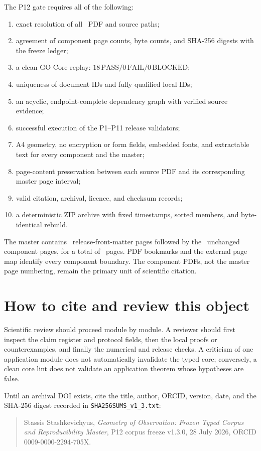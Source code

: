 \documentclass[11pt,a4paper]{article}
\theoremstyle{definition}
\theoremstyle{plain}
\theoremstyle{remark}
\begin{document}
The P12 gate requires all of the following:
\begin{enumerate}[leftmargin=*,itemsep=2pt]
  \item exact resolution of all \ModuleCount\ PDF and source paths;
  \item agreement of component page counts, byte counts, and SHA-256
    digests with the freeze ledger;
  \item a clean GO Core replay:
    \(18\,\mathrm{PASS}/0\,\mathrm{FAIL}/0\,\mathrm{BLOCKED}\);
  \item uniqueness of document IDs and fully qualified local IDs;
  \item an acyclic, endpoint-complete dependency graph with verified
    source evidence;
  \item successful execution of the P1--P11 release validators;
  \item A4 geometry, no encryption or form fields, embedded fonts, and
    extractable text for every component and the master;
  \item page-content preservation between each source PDF and its
    corresponding master page interval;
  \item valid citation, archival, licence, and checksum records;
  \item a deterministic ZIP archive with fixed timestamps, sorted
    members, and byte-identical rebuild.
\end{enumerate}

The master contains \FrontMatterPageCount\ release-front-matter pages
followed by the \ComponentPageCount\ unchanged component pages, for a
total of \MasterPageCount\ pages.  PDF bookmarks and the external page
map identify every component boundary.  The component PDFs, not the
master page numbering, remain the primary unit of scientific citation.

\section{How to cite and review this object}

Scientific review should proceed module by module.  A reviewer should
first inspect the claim register and protocol fields, then the local
proofs or counterexamples, and finally the numerical and release
checks.  A criticism of one application module does not automatically
invalidate the typed core; conversely, a clean core lint does not
validate an application theorem whose hypotheses are false.

Until an archival DOI exists, cite the title, author, ORCID, version,
date, and the SHA-256 digest recorded in
\texttt{SHA256SUMS\_v1\_3.txt}:
\begin{quote}\small
Stassis Stashkevichyus,
\emph{Geometry of Observation: Frozen Typed Corpus and Reproducibility
Master}, P12 corpus freeze v1.3.0, 28 July 2026,
ORCID 0009-0000-2294-705X.
\end{quote}
\end{document}
